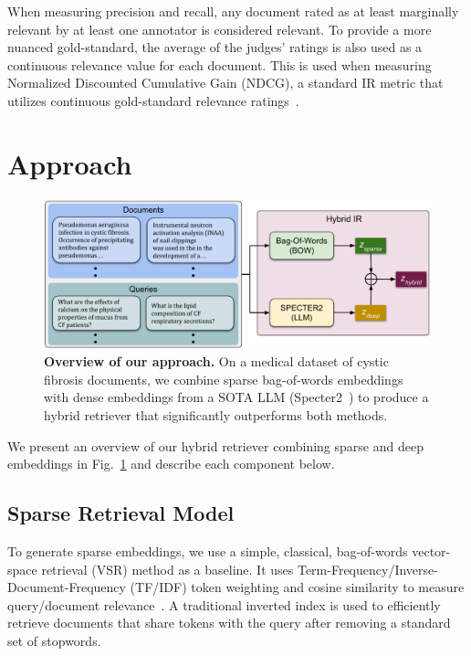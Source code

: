 \documentclass[
]{ceurart}
\begin{document}
When measuring precision and recall, any document rated as at least marginally relevant by at least one annotator is considered relevant. To provide a more nuanced gold-standard, the average of the judges' ratings is also used as a continuous relevance value for each document. This is used when measuring Normalized Discounted Cumulative Gain (NDCG), a standard IR metric that utilizes continuous gold-standard relevance ratings~\cite{ndcg,manning:book08}.

\section{Approach}

\begin{figure}[!t]
\centering
\begin{center}
\includegraphics[width=\linewidth]{figures/overview.pdf}
\end{center}
\caption{\textbf{Overview of our approach.} On a medical dataset of cystic fibrosis documents, we combine sparse bag-of-words embeddings with dense embeddings from a SOTA LLM (Specter2~\cite{singh2023scirepeval}) to produce a hybrid retriever that significantly outperforms both methods. }
\label{fig:overview}
\end{figure}

We present an overview of our hybrid retriever combining sparse and deep embeddings in Fig.~\ref{fig:overview} and describe each component below.

\subsection{Sparse Retrieval Model}

To generate sparse embeddings, we use a simple, classical, bag-of-words vector-space retrieval (VSR)  method as a baseline.  It uses Term-Frequency/Inverse-Document-Frequency (TF/IDF) token weighting and cosine similarity to measure query/document relevance~\cite{baeza-yates:book99,manning:book08}.  A traditional inverted index is used to efficiently retrieve documents that share tokens with the query after removing a standard set of stopwords.  
\end{document}
